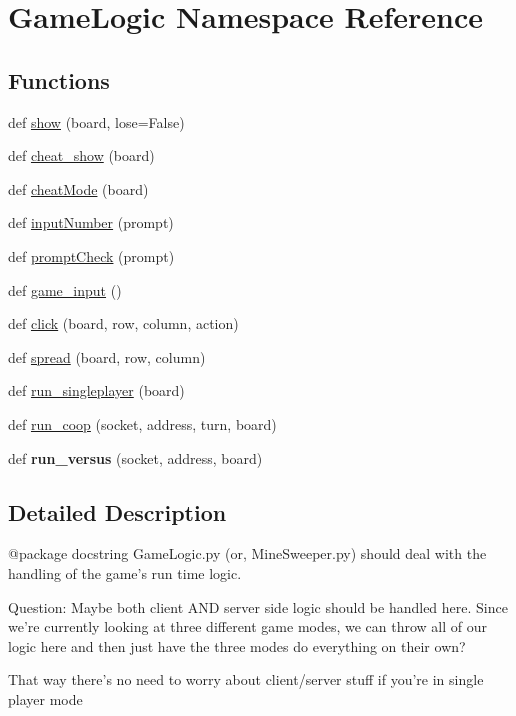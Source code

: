 \hypertarget{namespace_game_logic}{}\section{Game\+Logic Namespace Reference}
\label{namespace_game_logic}
\subsection*{Functions}
\begin{DoxyCompactItemize}
\item 
def \hyperlink{namespace_game_logic_afacbe6e69e6b939244d8c5f0aba5ff34}{show} (board, lose=False)
\item 
def \hyperlink{namespace_game_logic_ab23e4dd8920efb5dc428f599388dbc70}{cheat\+\_\+show} (board)
\item 
def \hyperlink{namespace_game_logic_ac701e0d880a5e8c09baf395c2f5d2a19}{cheat\+Mode} (board)
\item 
def \hyperlink{namespace_game_logic_a9e9b9869e1330923fbe2a0cb04b6c50d}{input\+Number} (prompt)
\item 
def \hyperlink{namespace_game_logic_aa208d35c45f200a28a8503ad891fd391}{prompt\+Check} (prompt)
\item 
def \hyperlink{namespace_game_logic_a4476538b080b2e54e2cf920d47385884}{game\+\_\+input} ()
\item 
def \hyperlink{namespace_game_logic_a8565813a63f94dd1e8325cbc3b2015bb}{click} (board, row, column, action)
\item 
def \hyperlink{namespace_game_logic_ae766be9cec703745c4f97f4f85a79dfc}{spread} (board, row, column)
\item 
def \hyperlink{namespace_game_logic_aa19068ecba13ba5dae3258c28138983d}{run\+\_\+singleplayer} (board)
\item 
def \hyperlink{namespace_game_logic_afc48c64dfaba7c18f642ab23e8e3a3bf}{run\+\_\+coop} (socket, address, turn, board)
\item 
\mbox{\label{namespace_game_logic_ae210e41405e4a019624993e6eec6b99a}} 
def {\bfseries run\+\_\+versus} (socket, address, board)
\end{DoxyCompactItemize}


\subsection{Detailed Description}
\begin{DoxyVerb}@package docstring
GameLogic.py (or, MineSweeper.py) should deal with the handling of the game's
run time logic.

Question: Maybe both client AND server side logic should be handled here. Since
we're currently looking at three different game modes, we can throw all of our
logic here and then just have the three modes do everything on their own?

That way there's no need to worry about client/server stuff if you're in
single player mode
\end{DoxyVerb}
 

